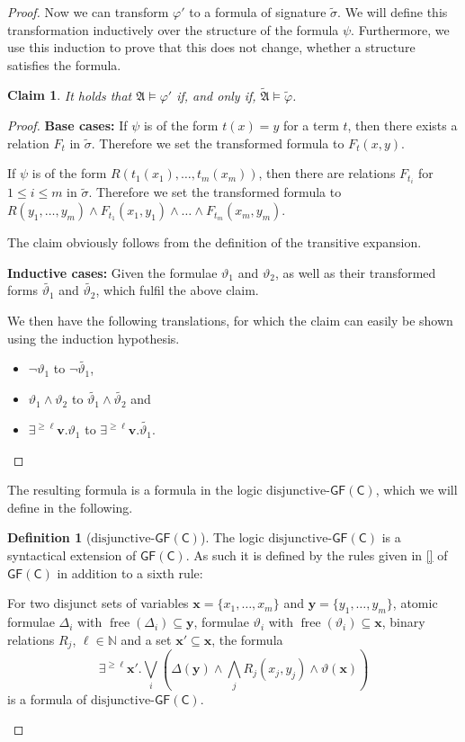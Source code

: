 \documentclass[a4paper,11pt,DIV=15]{scrartcl} %
\renewcommand{\phi}{\varphi}
\theoremstyle{plain}
\newtheorem{claim}[theorem]{Claim}
\theoremstyle{definition}
\newtheorem{definition}[theorem]{Definition}
\newcommand{\GFC}{\mathsf{GF}(\mathsf{C})}
\newcommand{\free}[1]{\operatorname{free}(#1)}
\renewcommand{\theta}{\vartheta}
\begin{document}
\begin{proof}
	Now we can transform $\phi'$ to a formula of signature $\widetilde{\sigma}$.
	We will define this transformation inductively over the structure of the formula $\psi$.
	Furthermore, we use this induction to prove that this does not change, whether a structure satisfies the formula. 
	\begin{claim}
		It holds that $\mathfrak A\models \phi'$ if, and only if, $\widetilde{\mathfrak A}\models \widetilde{\phi}$.
	\end{claim}
	\begin{proof}
		\textbf{Base cases:}
		If $\psi$ is of the form $t(x)=y$ for a term $t$, then there exists a relation $F_t$ in $\widetilde{\sigma}$. Therefore we set the transformed formula to $F_t(x,y)$.
		
		If $\psi$ is of the form $R(t_1(x_1),\dots,t_m(x_m))$, then there are relations $F_{t_i}$ for $1\leq i \leq m$ in $\widetilde{\sigma}$. Therefore we set the transformed formula to $R(y_1,\dots,y_m)\land F_{t_1}(x_1,y_1)\land\dots\land F_{t_m}(x_m,y_m)$.
		
		The claim obviously follows from the definition of the transitive expansion.
		
		\textbf{Inductive cases:}
		Given the formulae $\theta_1$ and $\theta_2$, as well as their transformed forms $\widetilde{\theta_1}$ and $\widetilde{\theta_2}$, which fulfil the above claim.
		
		We then have the following translations, for which the claim can easily be shown using the induction hypothesis.
		\begin{itemize}
			\item $\neg \theta_1$ to $\neg \widetilde{\theta_1}$,
			\item $\theta_1\land\theta_2$ to $\widetilde{\theta_1}\land\widetilde{\theta_2}$ and
			\item $\exists^{\geq\ell}\mathbf v.\theta_1$ to $\exists^{\geq \ell}\mathbf v. \widetilde{\theta_1}$.
		\end{itemize}
	\end{proof}
	
	The resulting formula is a formula in the logic $\text{disjunctive-}\GFC$, which we will define in the following.
	
	\begin{definition}[$\text{disjunctive-}\GFC$]
		The logic $\text{disjunctive-}\GFC$ is a syntactical extension of $\GFC$.
		As such it is defined by the rules given in \ref{} of $\GFC$ in addition to a sixth rule:
		
		For two disjunct sets of variables $\mathbf x=\{x_1,\dots,x_m\}$ and $\mathbf y=\{y_1,\dots,y_m\}$, atomic formulae $\Delta_i$ with $\free{\Delta_i}\subseteq \mathbf y$, formulae $\theta_i$ with $\free{\theta_i}\subseteq \mathbf x$, binary relations $R_j$, $\ell\in\mathbb N$ and a set $\mathbf{x'}\subseteq \mathbf{x}$, the formula 
		$$\exists^{\geq\ell}\mathbf {x'}.\bigvee_i\left(\Delta(\mathbf y) \land \bigwedge_j R_j(x_j, y_j) \land \theta(\mathbf x)\right)$$
		is a formula of $\text{disjunctive-}\GFC$.
		\label{disjunctiveGFCDef}
	\end{definition}
	

\end{proof}
\end{document}
